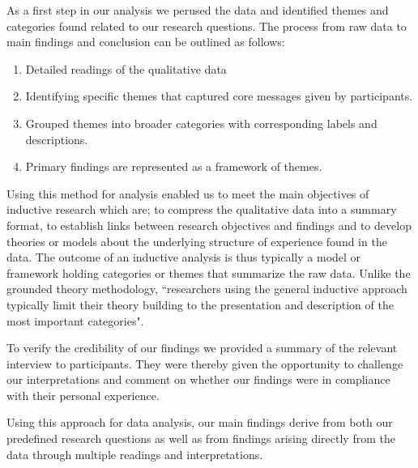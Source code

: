 As a first step in our analysis we perused the data and identified themes and categories found related to our research questions. The process from raw data to main findings and conclusion can be outlined as follows:
\begin{enumerate}
\vspace{0,5cm}
\item Detailed readings of the qualitative data
\item Identifying specific themes that captured core messages given by participants.
\item Grouped themes into broader categories with corresponding labels and descriptions.
\item Primary findings are represented as a framework of themes.
\vspace{0,5cm}
\end{enumerate}

Using this method for analysis enabled us to meet the main objectives of inductive research which are; to compress the qualitative data into a summary format, to establish links between research objectives and findings and to develop theories or models about the underlying structure of experience found in the data\cite{thomas2006general}. The outcome of an inductive analysis is thus typically a model or framework holding categories or themes that summarize the raw data. Unlike the grounded theory methodology, ``researchers using the general inductive approach typically limit their theory building to the presentation and description of the most important categories"\cite{thomas2006general}.

To verify the credibility of our findings we provided a summary of the relevant interview to participants. They were thereby given the opportunity to challenge our interpretations and comment on whether our findings were in compliance with their personal experience.

Using this approach for data analysis, our main findings derive from both our predefined research questions as well as from findings arising directly from the data through multiple readings and interpretations. 

